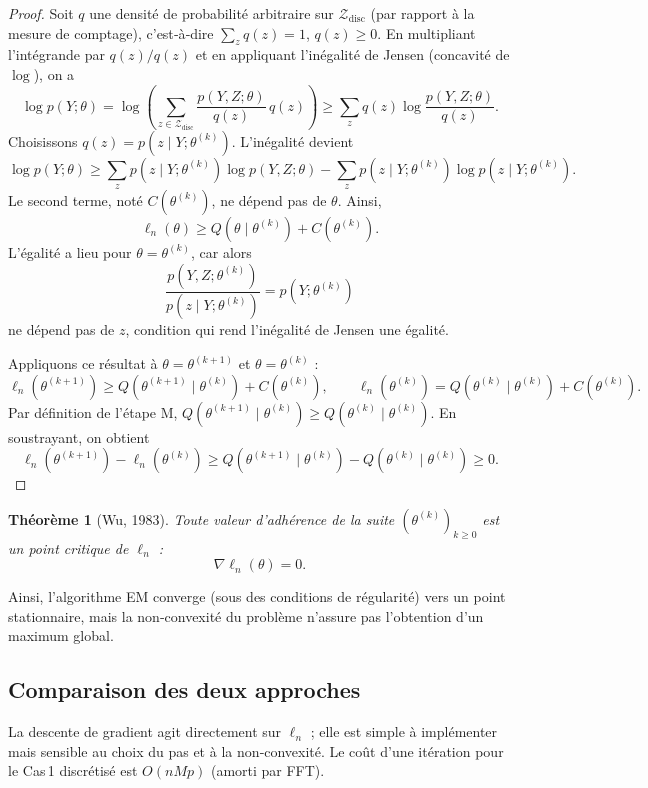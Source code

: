 \documentclass[12pt, a4paper]{article}
\newtheorem{theorem}{Théorème}[section]
\theoremstyle{definition}
\begin{document}
\begin{proof}
Soit $q$ une densité de probabilité arbitraire sur $\mathcal{Z}_{\text{disc}}$ (par rapport à la mesure de comptage), c'est‑à‑dire $\sum_{z} q(z)=1$, $q(z)\ge 0$. En multipliant l'intégrande par $q(z)/q(z)$ et en appliquant l'inégalité de Jensen (concavité de $\log$), on a
\[
\log p(Y;\theta) = \log \left( \sum_{z\in\mathcal{Z}_{\text{disc}}} \frac{p(Y,Z;\theta)}{q(z)} \, q(z) \right)
\ge \sum_{z} q(z) \log\frac{p(Y,Z;\theta)}{q(z)}.
\]
Choisissons $q(z) = p(z\mid Y;\theta^{(k)})$. L'inégalité devient
\[
\log p(Y;\theta) \ge \sum_{z} p(z\mid Y;\theta^{(k)}) \log p(Y,Z;\theta)
- \sum_{z} p(z\mid Y;\theta^{(k)}) \log p(z\mid Y;\theta^{(k)}).
\]
Le second terme, noté $C(\theta^{(k)})$, ne dépend pas de $\theta$. Ainsi,
\[
\ell_n(\theta) \ge Q(\theta\mid\theta^{(k)}) + C(\theta^{(k)}).
\]
L'égalité a lieu pour $\theta = \theta^{(k)}$, car alors
\[
\frac{p(Y,Z;\theta^{(k)})}{p(z\mid Y;\theta^{(k)})} = p(Y;\theta^{(k)})
\]
ne dépend pas de $z$, condition qui rend l'inégalité de Jensen une égalité.

Appliquons ce résultat à $\theta = \theta^{(k+1)}$ et $\theta = \theta^{(k)}$ :
\[
\ell_n(\theta^{(k+1)}) \ge Q(\theta^{(k+1)}\mid\theta^{(k)}) + C(\theta^{(k)}), \qquad
\ell_n(\theta^{(k)}) = Q(\theta^{(k)}\mid\theta^{(k)}) + C(\theta^{(k)}).
\]
Par définition de l'étape M, $Q(\theta^{(k+1)}\mid\theta^{(k)}) \ge Q(\theta^{(k)}\mid\theta^{(k)})$. En soustrayant, on obtient
\[
\ell_n(\theta^{(k+1)}) - \ell_n(\theta^{(k)}) \ge Q(\theta^{(k+1)}\mid\theta^{(k)}) - Q(\theta^{(k)}\mid\theta^{(k)}) \ge 0.
\]
\end{proof}

\begin{theorem}[Wu, 1983]
Toute valeur d'adhérence de la suite $(\theta^{(k)})_{k\ge0}$ est un point critique de $\ell_n$ :
\[
\nabla\ell_n(\theta)=0.
\]
\end{theorem}

Ainsi, l'algorithme EM converge (sous des conditions de régularité) vers un point stationnaire, mais la non‑convexité du problème n'assure pas l'obtention d'un maximum global.

\subsection{Comparaison des deux approches}
\label{subsec:comparaison}

La descente de gradient agit directement sur $\ell_n$ ; elle est simple à implémenter mais sensible au choix du pas et à la non‑convexité. Le coût d'une itération pour le Cas 1 discrétisé est $O(nMp)$ (amorti par FFT).
\end{document}
